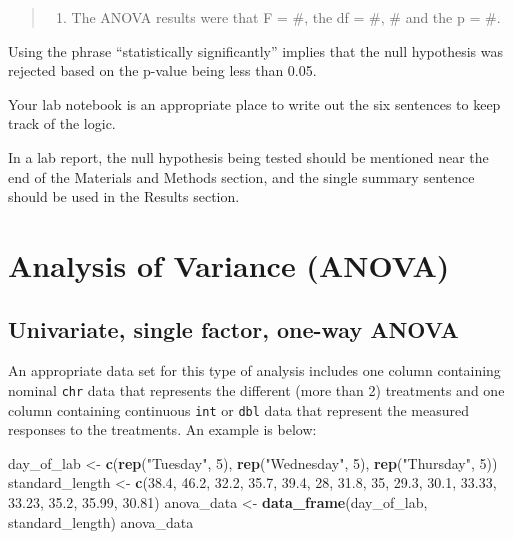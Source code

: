 \documentclass[twoside, 12pt]{article}
\newenvironment{Shaded}{\begin{snugshade}}{\end{snugshade}}
\newcommand{\KeywordTok}[1]{\textcolor[rgb]{0.13,0.29,0.53}{\textbf{{#1}}}}
\newcommand{\DecValTok}[1]{\textcolor[rgb]{0.00,0.00,0.81}{{#1}}}
\newcommand{\FloatTok}[1]{\textcolor[rgb]{0.00,0.00,0.81}{{#1}}}
\newcommand{\StringTok}[1]{\textcolor[rgb]{0.31,0.60,0.02}{{#1}}}
\newcommand{\NormalTok}[1]{{#1}}
\providecommand{\tightlist}{%
  \setlength{\itemsep}{0pt}\setlength{\parskip}{0pt}}
\begin{document}
\begin{quote}
\begin{enumerate}
\def\labelenumi{\arabic{enumi}.}
\setcounter{enumi}{5}
\tightlist
\item
  The ANOVA results were that F = \#, the df = \#, \# and the p = \#.
\end{enumerate}
\end{quote}

Using the phrase ``statistically significantly'' implies that the null
hypothesis was rejected based on the p-value being less than 0.05.

Your lab notebook is an appropriate place to write out the six sentences
to keep track of the logic.

In a lab report, the null hypothesis being tested should be mentioned
near the end of the Materials and Methods section, and the single
summary sentence should be used in the Results section.

\section{Analysis of Variance (ANOVA)}\label{analysis-of-variance-anova}

\subsection*{Univariate, single factor, one-way
ANOVA}\label{univariate-single-factor-one-way-anova}

An appropriate data set for this type of analysis includes one column
containing nominal \texttt{chr} data that represents the different (more
than 2) treatments and one column containing continuous \texttt{int} or
\texttt{dbl} data that represent the measured responses to the
treatments. An example is below:

\begin{Shaded}
\begin{Highlighting}[]
\NormalTok{day_of_lab <-}\StringTok{ }\KeywordTok{c}\NormalTok{(}\KeywordTok{rep}\NormalTok{(}\StringTok{"Tuesday"}\NormalTok{, }\DecValTok{5}\NormalTok{), }\KeywordTok{rep}\NormalTok{(}\StringTok{"Wednesday"}\NormalTok{, }\DecValTok{5}\NormalTok{), }
                \KeywordTok{rep}\NormalTok{(}\StringTok{"Thursday"}\NormalTok{, }\DecValTok{5}\NormalTok{))}
\NormalTok{standard_length <-}\StringTok{ }\KeywordTok{c}\NormalTok{(}\FloatTok{38.4}\NormalTok{, }\FloatTok{46.2}\NormalTok{, }\FloatTok{32.2}\NormalTok{, }\FloatTok{35.7}\NormalTok{, }\FloatTok{39.4}\NormalTok{, }
                     \DecValTok{28}\NormalTok{, }\FloatTok{31.8}\NormalTok{, }\DecValTok{35}\NormalTok{, }\FloatTok{29.3}\NormalTok{, }\FloatTok{30.1}\NormalTok{,}
                     \FloatTok{33.33}\NormalTok{, }\FloatTok{33.23}\NormalTok{, }\FloatTok{35.2}\NormalTok{, }\FloatTok{35.99}\NormalTok{, }\FloatTok{30.81}\NormalTok{)}
\NormalTok{anova_data <-}\StringTok{ }\KeywordTok{data_frame}\NormalTok{(day_of_lab, standard_length)}
\NormalTok{anova_data}
\end{Highlighting}
\end{Shaded}
\end{document}
